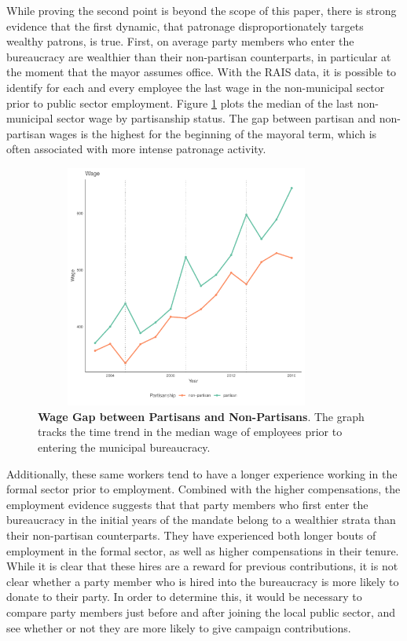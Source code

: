 \documentclass[12pt,a4paper]{article}
\begin{document}
While proving the second point is beyond the scope of this paper, there is strong evidence that the first dynamic, that patronage disproportionately targets wealthy patrons, is true. First, on average party members who enter the bureaucracy are wealthier than their non-partisan counterparts, in particular at the moment that the mayor assumes office. With the RAIS data, it is possible to identify for each and every employee the last wage in the non-municipal sector prior to public sector employment. Figure \ref{fig:wage_differential} plots the median of the last non-municipal sector wage by partisanship status. The gap between partisan and non-partisan wages is the highest for the beginning of the mayoral term, which is often associated with more intense patronage activity.

\begin{figure}[H]
    \centering
    \includegraphics[width = 10cm, height = 8cm]{figures/partisanship/plot_median_wage.pdf}
    \caption{\textbf{Wage Gap between Partisans and Non-Partisans}. The graph tracks the time trend in the median wage of employees prior to entering the municipal bureaucracy.}
    \label{fig:wage_differential}
\end{figure}

Additionally, these same workers tend to have a longer experience working in the formal sector prior to employment. Combined with the higher compensations, the employment evidence suggests that that party members who first enter the bureaucracy in the initial years of the mandate belong to a wealthier strata than their non-partisan counterparts. They have experienced both longer bouts of employment in the formal sector, as well as higher compensations in their tenure. While it is clear that these hires are a reward for previous contributions, it is not clear whether a party member who is hired into the bureaucracy is more likely to donate to their party. In order to determine this, it would be necessary to compare party members just before and after joining the local public sector, and see whether or not they are more likely to give campaign contributions.
\end{document}
